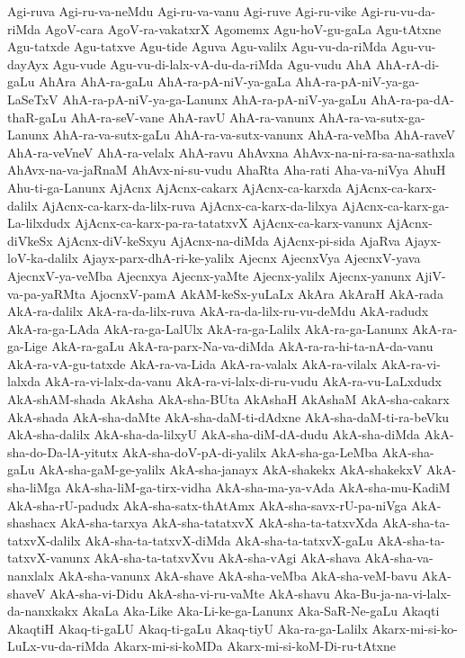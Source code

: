 {Agi-ruva
Agi-ru-va-neMdu
Agi-ru-va-vanu
Agi-ruve
Agi-ru-vike
Agi-ru-vu-da-riMda
AgoV-cara
AgoV-ra-vakatxrX
Agomemx
Agu-hoV-gu-gaLa
Agu-tAtxne
Agu-tatxde
Agu-tatxve
Agu-tide
Aguva
Agu-valilx
Agu-vu-da-riMda
Agu-vu-dayAyx
Agu-vude
Agu-vu-di-lalx-vA-du-da-riMda
Agu-vudu
AhA
AhA-rA-di-gaLu
AhAra
AhA-ra-gaLu
AhA-ra-pA-niV-ya-gaLa
AhA-ra-pA-niV-ya-ga-LaSeTxV
AhA-ra-pA-niV-ya-ga-Lanunx
AhA-ra-pA-niV-ya-gaLu
AhA-ra-pa-dA-thaR-gaLu
AhA-ra-seV-vane
AhA-ravU
AhA-ra-vanunx
AhA-ra-va-sutx-ga-Lanunx
AhA-ra-va-sutx-gaLu
AhA-ra-va-sutx-vanunx
AhA-ra-veMba
AhA-raveV
AhA-ra-veVneV
AhA-ra-velalx
AhA-ravu
AhAvxna
AhAvx-na-ni-ra-sa-na-sathxla
AhAvx-na-va-jaRnaM
AhAvx-ni-su-vudu
AhaRta
Aha-rati
Aha-va-niVya
AhuH
Ahu-ti-ga-Lanunx
AjAcnx
AjAcnx-cakarx
AjAcnx-ca-karxda
AjAcnx-ca-karx-dalilx
AjAcnx-ca-karx-da-lilx-ruva
AjAcnx-ca-karx-da-lilxya
AjAcnx-ca-karx-ga-La-lilxdudx
AjAcnx-ca-karx-pa-ra-tatatxvX
AjAcnx-ca-karx-vanunx
AjAcnx-diVkeSx
AjAcnx-diV-keSxyu
AjAcnx-na-diMda
AjAcnx-pi-sida
AjaRva
Ajayx-loV-ka-dalilx
Ajayx-parx-dhA-ri-ke-yalilx
Ajecnx
AjecnxVya
AjecnxV-yava
AjecnxV-ya-veMba
Ajecnxya
Ajecnx-yaMte
Ajecnx-yalilx
Ajecnx-yanunx
AjiV-va-pa-yaRMta
AjocnxV-pamA
AkAM-keSx-yuLaLx
AkAra
AkAraH
AkA-rada
AkA-ra-dalilx
AkA-ra-da-lilx-ruva
AkA-ra-da-lilx-ru-vu-deMdu
AkA-radudx
AkA-ra-ga-LAda
AkA-ra-ga-LalUlx
AkA-ra-ga-Lalilx
AkA-ra-ga-Lanunx
AkA-ra-ga-Lige
AkA-ra-gaLu
AkA-ra-parx-Na-va-diMda
AkA-ra-ra-hi-ta-nA-da-vanu
AkA-ra-vA-gu-tatxde
AkA-ra-va-Lida
AkA-ra-valalx
AkA-ra-vilalx
AkA-ra-vi-lalxda
AkA-ra-vi-lalx-da-vanu
AkA-ra-vi-lalx-di-ru-vudu
AkA-ra-vu-LaLxdudx
AkA-shAM-shada
AkAsha
AkA-sha-BUta
AkAshaH
AkAshaM
AkA-sha-cakarx
AkA-shada
AkA-sha-daMte
AkA-sha-daM-ti-dAdxne
AkA-sha-daM-ti-ra-beVku
AkA-sha-dalilx
AkA-sha-da-lilxyU
AkA-sha-diM-dA-dudu
AkA-sha-diMda
AkA-sha-do-Da-lA-yitutx
AkA-sha-doV-pA-di-yalilx
AkA-sha-ga-LeMba
AkA-sha-gaLu
AkA-sha-gaM-ge-yalilx
AkA-sha-janayx
AkA-shakekx
AkA-shakekxV
AkA-sha-liMga
AkA-sha-liM-ga-tirx-vidha
AkA-sha-ma-ya-vAda
AkA-sha-mu-KadiM
AkA-sha-rU-padudx
AkA-sha-satx-thAtAmx
AkA-sha-savx-rU-pa-niVga
AkA-shashacx
AkA-sha-tarxya
AkA-sha-tatatxvX
AkA-sha-ta-tatxvXda
AkA-sha-ta-tatxvX-dalilx
AkA-sha-ta-tatxvX-diMda
AkA-sha-ta-tatxvX-gaLu
AkA-sha-ta-tatxvX-vanunx
AkA-sha-ta-tatxvXvu
AkA-sha-vAgi
AkA-shava
AkA-sha-va-nanxlalx
AkA-sha-vanunx
AkA-shave
AkA-sha-veMba
AkA-sha-veM-bavu
AkA-shaveV
AkA-sha-vi-Didu
AkA-sha-vi-ru-vaMte
AkA-shavu
Aka-Bu-ja-na-vi-lalx-da-nanxkakx
AkaLa
Aka-Like
Aka-Li-ke-ga-Lanunx
Aka-SaR-Ne-gaLu
Akaqti
AkaqtiH
Akaq-ti-gaLU
Akaq-ti-gaLu
Akaq-tiyU
Aka-ra-ga-Lalilx
Akarx-mi-si-ko-LuLx-vu-da-riMda
Akarx-mi-si-koMDa
Akarx-mi-si-koM-Di-ru-tAtxne
}
